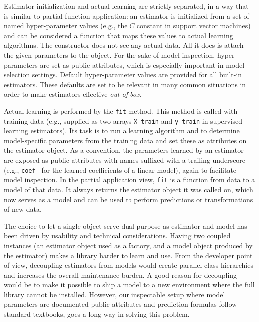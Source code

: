 \documentclass[twocolumn]{article}
\begin{document}
Estimator initialization and actual learning are strictly separated,
in a way that is similar to partial function application:
an estimator is initialized from a set of named hyper-parameter values
(e.g., the $C$ constant in support vector machines)
and can be considered a function
that maps these values to actual learning algorithms.
The constructor does not see any actual data.
All it does is attach the given parameters to the object.
For the sake of model inspection, hyper-parameters are set as public attributes,
which is especially important in model selection settings.
Default hyper-parameter values are provided for all built-in estimators.
These defaults are set to be relevant in many common
situations in order to make estimators effective \textit{out-of-box}.

Actual learning is performed by the \texttt{fit} method. This method is called
with training data (e.g., supplied as two arrays \texttt{X\_train} and
\texttt{y\_train} in supervised learning estimators). Its task is to run a
learning algorithm and to determine model-specific parameters from the training
data and set these as attributes on the estimator object. As a convention, the
parameters learned by an estimator are exposed as public attributes with names
suffixed with a trailing underscore (e.g., \texttt{coef\_} for the
learned coefficients of a linear model),
again to facilitate model inspection.
In the partial application view,
\texttt{fit} is a function from data to a model of that data.
It always returns the estimator object it was called on,
which now serves as a model and can be used to perform predictions
or transformations of new data.

The choice to let a single object serve dual purpose as
estimator and model has been driven by usability and technical considerations.
Having two coupled instances
(an estimator object used as a factory, and a model object produced by the estimator)
makes a library harder to learn and use.
From the developer point of view, decoupling
estimators from models would create parallel class hierarchies and increases the
overall maintenance burden.
A good reason for decoupling would be to make it possible to ship a model
to a new environment where the full library cannot be installed.
However, our inspectable setup where model parameters are documented
public attributes and prediction formulas follow standard textbooks,
goes a long way in solving this problem.
\end{document}
